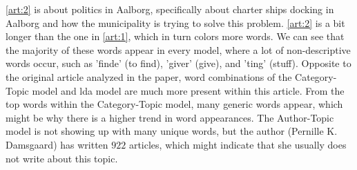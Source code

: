\autoref{art:2} is about politics in Aalborg, specifically about charter ships docking in Aalborg and how the municipality is trying to solve this problem.
\autoref{art:2} is a bit longer than the one in \autoref{art:1}, which in turn colors more words.
We can see that the majority of these words appear in every model, where a lot of non-descriptive words occur, such as 'finde' (to find), 'giver' (give), and 'ting' (stuff). 
Opposite to the original article analyzed in the paper, word combinations of the Category-Topic model and \gls{lda} model are much more present within this article.
From the top words within the Category-Topic model, many generic words appear, which might be why there is a higher trend in word appearances.
The Author-Topic model is not showing up with many unique words, but the author (Pernille K. Damsgaard) has written $922$ articles, which might indicate that she usually does not write about this topic.
\\
